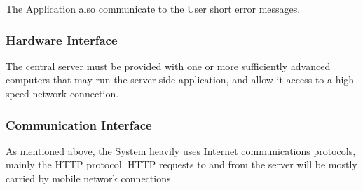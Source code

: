 The Application also communicate to the User short error messages.
	
\subsubsection{Hardware Interface}


The central server must be provided with one or more sufficiently advanced computers that may run the server-side application, and allow it access to a high-speed network connection.


\subsubsection{Communication Interface}
As mentioned above, the System heavily uses Internet communications protocols, mainly the HTTP protocol. HTTP requests to and from the server will be mostly carried by mobile network connections.